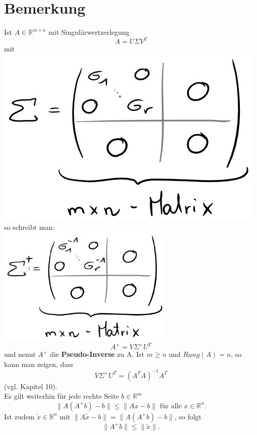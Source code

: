 \documentclass{scrbook}
\begin{document}
\section{Bemerkung}
Ist $A \in \mathbb{R}^{m \times n}$ mit Singulärwertzerlegung
\[
A = U\Sigma V^T
\]
mit\\
\includegraphics{Bemerkung_14_4_1.jpeg}\\
so schreibt man:
\\
\includegraphics{Bemerkung_14_4_2.jpeg}
\\
\[A^+ = V \Sigma^+ U^T\]
und nennt $A^+$ die \textbf{Pseudo-Inverse} zu A. Ist $m \geq n$ und $Rang(A) = n$, so kann man zeigen, dass\[V \Sigma^+ U^T = (A^TA)^{-1}A^T \] (vgl. Kapitel 10).\\
Es gilt weiterhin für jede rechte Seite $b \in \mathbb{R}^m$
\[\| A(A^+b)-b\| \leq \|Ax-b\| \text{ für alle } x \in \mathbb{R}^n.\]
Ist zudem $\tilde{x} \in \mathbb{R}^n$ mit $ \|A \tilde{x} -b \| = \|A(A^+b)-b\|$, so folgt
\[\|A^+b\| \leq \|\tilde{x} \|.\]
\end{document}

